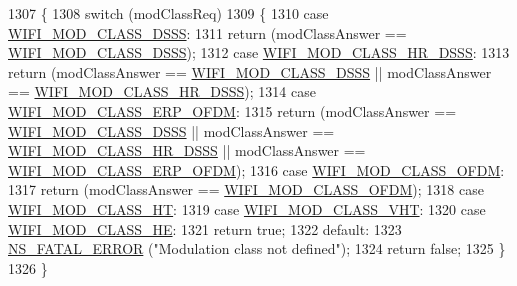 \begin{DoxyCode}
1307 \{
1308   \textcolor{keywordflow}{switch} (modClassReq)
1309     \{
1310     \textcolor{keywordflow}{case} \hyperlink{namespacens3_aa999e1221606a2b21b1eb33c2007c217aed8070e1ee089724d73fe63030cc112c}{WIFI\_MOD\_CLASS\_DSSS}:
1311       \textcolor{keywordflow}{return} (modClassAnswer == \hyperlink{namespacens3_aa999e1221606a2b21b1eb33c2007c217aed8070e1ee089724d73fe63030cc112c}{WIFI\_MOD\_CLASS\_DSSS});
1312     \textcolor{keywordflow}{case} \hyperlink{namespacens3_aa999e1221606a2b21b1eb33c2007c217a3c847bbae970f2de31e7b4eb7ff49840}{WIFI\_MOD\_CLASS\_HR\_DSSS}:
1313       \textcolor{keywordflow}{return} (modClassAnswer == \hyperlink{namespacens3_aa999e1221606a2b21b1eb33c2007c217aed8070e1ee089724d73fe63030cc112c}{WIFI\_MOD\_CLASS\_DSSS} || modClassAnswer == 
      \hyperlink{namespacens3_aa999e1221606a2b21b1eb33c2007c217a3c847bbae970f2de31e7b4eb7ff49840}{WIFI\_MOD\_CLASS\_HR\_DSSS});
1314     \textcolor{keywordflow}{case} \hyperlink{namespacens3_aa999e1221606a2b21b1eb33c2007c217afc1f5ef8d2c985f37a3224dd86ab014d}{WIFI\_MOD\_CLASS\_ERP\_OFDM}:
1315       \textcolor{keywordflow}{return} (modClassAnswer == \hyperlink{namespacens3_aa999e1221606a2b21b1eb33c2007c217aed8070e1ee089724d73fe63030cc112c}{WIFI\_MOD\_CLASS\_DSSS} || modClassAnswer == 
      \hyperlink{namespacens3_aa999e1221606a2b21b1eb33c2007c217a3c847bbae970f2de31e7b4eb7ff49840}{WIFI\_MOD\_CLASS\_HR\_DSSS} || modClassAnswer == 
      \hyperlink{namespacens3_aa999e1221606a2b21b1eb33c2007c217afc1f5ef8d2c985f37a3224dd86ab014d}{WIFI\_MOD\_CLASS\_ERP\_OFDM});
1316     \textcolor{keywordflow}{case} \hyperlink{namespacens3_aa999e1221606a2b21b1eb33c2007c217a30a83a0318357c9611f09e6faadc8006}{WIFI\_MOD\_CLASS\_OFDM}:
1317       \textcolor{keywordflow}{return} (modClassAnswer == \hyperlink{namespacens3_aa999e1221606a2b21b1eb33c2007c217a30a83a0318357c9611f09e6faadc8006}{WIFI\_MOD\_CLASS\_OFDM});
1318     \textcolor{keywordflow}{case} \hyperlink{namespacens3_aa999e1221606a2b21b1eb33c2007c217a6ac45cac36cc4454649435d24ebf349c}{WIFI\_MOD\_CLASS\_HT}:
1319     \textcolor{keywordflow}{case} \hyperlink{namespacens3_aa999e1221606a2b21b1eb33c2007c217a9863e4342bf5c238c74dddfc4d96c67e}{WIFI\_MOD\_CLASS\_VHT}:
1320     \textcolor{keywordflow}{case} \hyperlink{namespacens3_aa999e1221606a2b21b1eb33c2007c217abfa4f7272510045a9b43e8ac27ac13b0}{WIFI\_MOD\_CLASS\_HE}:
1321       \textcolor{keywordflow}{return} \textcolor{keyword}{true};
1322     \textcolor{keywordflow}{default}:
1323       \hyperlink{group__fatal_ga5131d5e3f75d7d4cbfd706ac456fdc85}{NS\_FATAL\_ERROR} (\textcolor{stringliteral}{"Modulation class not defined"});
1324       \textcolor{keywordflow}{return} \textcolor{keyword}{false};
1325     \}
1326 \}
\end{DoxyCode}


